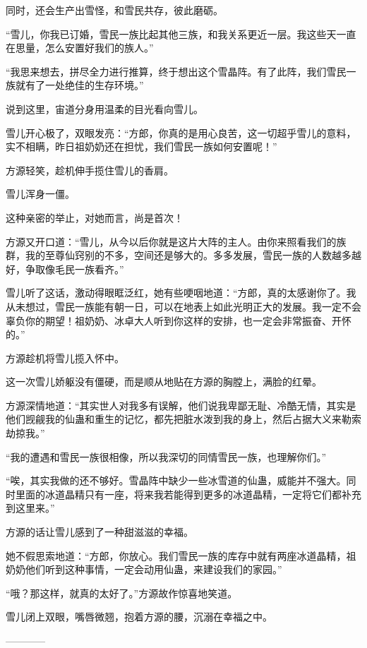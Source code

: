 \begin{this_body}
同时，还会生产出雪怪，和雪民共存，彼此磨砺。

“雪儿，你我已订婚，雪民一族比起其他三族，和我关系更近一层。我这些天一直在思量，怎么安置好我们的族人。”

“我思来想去，拼尽全力进行推算，终于想出这个雪晶阵。有了此阵，我们雪民一族就有了一处绝佳的生存环境。”

说到这里，宙道分身用温柔的目光看向雪儿。

雪儿开心极了，双眼发亮：“方郎，你真的是用心良苦，这一切超乎雪儿的意料，实不相瞒，昨日祖奶奶还在担忧，我们雪民一族如何安置呢！”

方源轻笑，趁机伸手揽住雪儿的香肩。

雪儿浑身一僵。

这种亲密的举止，对她而言，尚是首次！

方源又开口道：“雪儿，从今以后你就是这片大阵的主人。由你来照看我们的族群，我的至尊仙窍别的不多，空间还是够大的。多多发展，雪民一族的人数越多越好，争取像毛民一族看齐。”

雪儿听了这话，激动得眼眶泛红，她有些哽咽地道：“方郎，真的太感谢你了。我从未想过，雪民一族能有朝一日，可以在地表上如此光明正大的发展。我一定不会辜负你的期望！祖奶奶、冰卓大人听到你这样的安排，也一定会非常振奋、开怀的。”

方源趁机将雪儿揽入怀中。

这一次雪儿娇躯没有僵硬，而是顺从地贴在方源的胸膛上，满脸的红晕。

方源深情地道：“其实世人对我多有误解，他们说我卑鄙无耻、冷酷无情，其实是他们觊觎我的仙蛊和重生的记忆，都先把脏水泼到我的身上，然后占据大义来勒索劫掠我。”

“我的遭遇和雪民一族很相像，所以我深切的同情雪民一族，也理解你们。”

“唉，其实我做的还不够好。雪晶阵中缺少一些冰雪道的仙蛊，威能并不强大。同时里面的冰道晶精只有一座，将来我若能得到更多的冰道晶精，一定将它们都补充到这里来。”

方源的话让雪儿感到了一种甜滋滋的幸福。

她不假思索地道：“方郎，你放心。我们雪民一族的库存中就有两座冰道晶精，祖奶奶他们听到这种事情，一定会动用仙蛊，来建设我们的家园。”

“哦？那这样，就真的太好了。”方源故作惊喜地笑道。

雪儿闭上双眼，嘴唇微翘，抱着方源的腰，沉溺在幸福之中。

------------

\end{this_body}


